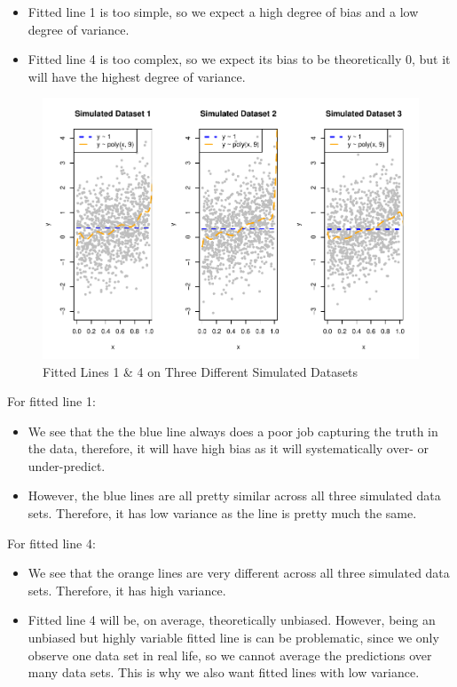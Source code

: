 \documentclass[
]{book}
\providecommand{\tightlist}{%
  \setlength{\itemsep}{0pt}\setlength{\parskip}{0pt}}
\begin{document}
\begin{itemize}
\tightlist
\item
  Fitted line 1 is too simple, so we expect a high degree of bias and a low degree of variance.
\item
  Fitted line 4 is too complex, so we expect its bias to be theoretically 0, but it will have the highest degree of variance.
\end{itemize}

\begin{figure}
\centering
\includegraphics{bookdown-demo_files/figure-latex/10-sims3-1.pdf}
\caption{\label{fig:10-sims3}Fitted Lines 1 \& 4 on Three Different Simulated Datasets}
\end{figure}

For fitted line 1:

\begin{itemize}
\tightlist
\item
  We see that the the blue line always does a poor job capturing the truth in the data, therefore, it will have high bias as it will systematically over- or under-predict.
\item
  However, the blue lines are all pretty similar across all three simulated data sets. Therefore, it has low variance as the line is pretty much the same.
\end{itemize}

For fitted line 4:

\begin{itemize}
\tightlist
\item
  We see that the orange lines are very different across all three simulated data sets. Therefore, it has high variance.
\item
  Fitted line 4 will be, on average, theoretically unbiased. However, being an unbiased but highly variable fitted line is can be problematic, since we only observe one data set in real life, so we cannot average the predictions over many data sets. This is why we also want fitted lines with low variance.
\end{itemize}
\end{document}
